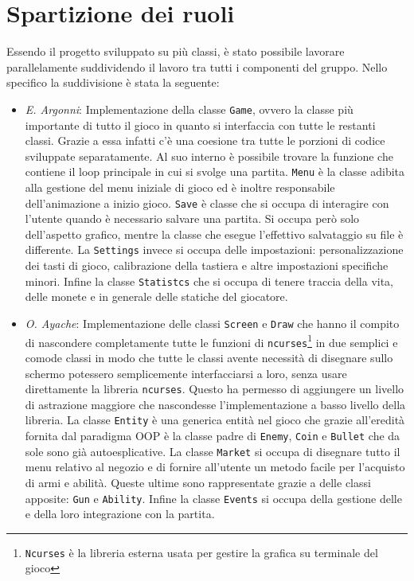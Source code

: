 \documentclass[a4paper]{article}
\begin{document}
\section{Spartizione dei ruoli}
Essendo il progetto sviluppato su più classi, è stato possibile lavorare 
parallelamente suddividendo il lavoro tra tutti i componenti del gruppo. Nello 
specifico la suddivisione è stata la seguente:
\begin{itemize}
  \item \emph{E. Argonni}: Implementazione della classe \texttt{Game}, ovvero la 
    classe più importante di tutto il gioco in quanto si interfaccia con tutte 
    le restanti classi. Grazie a essa infatti c'è una coesione tra tutte le 
    porzioni di codice sviluppate separatamente. Al suo interno è possibile 
    trovare la funzione che contiene il loop principale in cui si  svolge una 
    partita. \texttt{Menu} è la classe adibita alla gestione del menu iniziale 
    di gioco ed è inoltre responsabile dell'animazione a inizio gioco.
    \texttt{Save} è classe che si occupa di interagire con l'utente quando è 
    necessario salvare una partita. Si occupa però solo dell'aspetto grafico, 
    mentre la classe che esegue l'effettivo salvataggio su file è differente. 
    La \texttt{Settings} invece si occupa delle impostazioni: personalizzazione 
    dei tasti di gioco, calibrazione della tastiera e altre impostazioni 
    specifiche minori. Infine la classe \texttt{Statistcs} che si occupa di 
    tenere traccia della vita, delle monete e in generale delle statiche del 
    giocatore.

  \item \emph{O. Ayache}: Implementazione delle classi \texttt{Screen} e 
    \texttt{Draw} che hanno il compito di nascondere completamente tutte le 
    funzioni di \texttt{ncurses}\footnote{\texttt{Ncurses} è la libreria esterna 
    usata per gestire la grafica su terminale del gioco} in due semplici e 
    comode classi in modo che tutte le classi avente necessità di disegnare 
    sullo schermo potessero semplicemente interfacciarsi a loro, senza usare 
    direttamente la libreria \texttt{ncurses}. Questo ha permesso di aggiungere 
    un livello di astrazione maggiore che nascondesse l'implementazione a basso 
    livello della libreria. La classe \texttt{Entity} è una generica entità nel
    gioco che grazie all'eredità fornita dal paradigma OOP è la classe padre di
    \texttt{Enemy}, \texttt{Coin} e \texttt{Bullet} che da sole sono già 
    autoesplicative. La classe \texttt{Market} si occupa di disegnare tutto il 
    menu relativo al negozio e di fornire all'utente un metodo facile per 
    l'acquisto di armi e abilità. Queste ultime sono rappresentate grazie a
    delle classi apposite: \texttt{Gun} e \texttt{Ability}. Infine la classe 
    \texttt{Events} si occupa della gestione delle e della loro integrazione con
    la partita.


\end{itemize}
\end{document}
